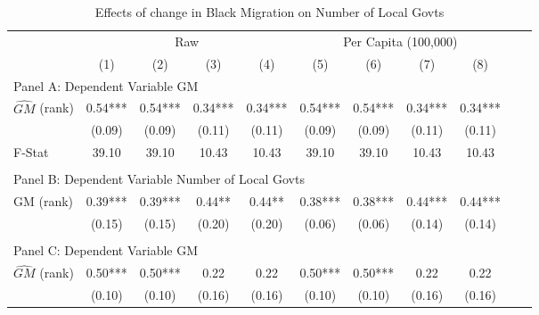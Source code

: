  \begin{table}[htbp]\centering {} \begin{threeparttable} \caption{Effects of change in Black Migration on Number of Local Govts} \begin{tabular}{l*{10}{c}} \toprule
                &\multicolumn{4}{c}{Raw}                                    &\multicolumn{4}{c}{Per Capita (100,000)}                   \\\cmidrule(lr){2-5}\cmidrule(lr){6-9}
                &\multicolumn{1}{c}{(1)}   &\multicolumn{1}{c}{(2)}   &\multicolumn{1}{c}{(3)}   &\multicolumn{1}{c}{(4)}   &\multicolumn{1}{c}{(5)}   &\multicolumn{1}{c}{(6)}   &\multicolumn{1}{c}{(7)}   &\multicolumn{1}{c}{(8)}   \\
\cmidrule(lr){1-9}
\multicolumn{8}{l}{Panel A: Dependent Variable GM}\\
\cmidrule(lr){1-9}
$\hat{GM}$ (rank)&       0.54***&       0.54***&       0.34***&       0.34***&       0.54***&       0.54***&       0.34***&       0.34***\\
                &     (0.09)   &     (0.09)   &     (0.11)   &     (0.11)   &     (0.09)   &     (0.09)   &     (0.11)   &     (0.11)   \\
\midrule
F-Stat          &      39.10   &      39.10   &      10.43   &      10.43   &      39.10   &      39.10   &      10.43   &      10.43   \\
\cmidrule[\heavyrulewidth](lr){1-9} \\ \cmidrule[\heavyrulewidth](lr){1-9}
\multicolumn{8}{l}{Panel B: Dependent Variable Number of Local Govts}\\
\cmidrule(lr){1-9}
GM  (rank)      &       0.39***&       0.39***&       0.44** &       0.44** &       0.38***&       0.38***&       0.44***&       0.44***\\
                &     (0.15)   &     (0.15)   &     (0.20)   &     (0.20)   &     (0.06)   &     (0.06)   &     (0.14)   &     (0.14)   \\
\cmidrule[\heavyrulewidth](lr){1-9} \\ \cmidrule[\heavyrulewidth](lr){1-9}
\multicolumn{8}{l}{Panel C: Dependent Variable GM}\\
\cmidrule(lr){1-9}
$\hat{GM}$ (rank)&       0.50***&       0.50***&       0.22   &       0.22   &       0.50***&       0.50***&       0.22   &       0.22   \\
                &     (0.10)   &     (0.10)   &     (0.16)   &     (0.16)   &     (0.10)   &     (0.10)   &     (0.16)   &     (0.16)   \\

\end{tabular}
\end{threeparttable}
\end{table}
